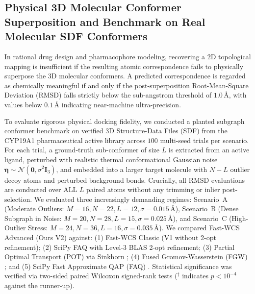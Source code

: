 \documentclass[conference]{IEEEtran}
\begin{document}
\subsection{Physical 3D Molecular Conformer Superposition and Benchmark on Real Molecular SDF Conformers}
\label{subsec:3d_conformer_benchmark}

In rational drug design and pharmacophore modeling, recovering a 2D topological mapping is insufficient if the resulting atomic correspondence fails to physically superpose the 3D molecular conformers. A predicted correspondence is regarded as chemically meaningful if and only if the post-superposition Root-Mean-Square Deviation (RMSD) falls strictly below the sub-angstrom threshold of $1.0\,\text{\AA}$, with values below $0.1\,\text{\AA}$ indicating near-machine ultra-precision.

To evaluate rigorous physical docking fidelity, we conducted a planted subgraph conformer benchmark on verified 3D Structure-Data Files (SDF) from the CYP19A1 pharmaceutical active library across $100$ multi-seed trials per scenario. For each trial, a ground-truth sub-conformer of size $L$ is extracted from an active ligand, perturbed with realistic thermal conformational Gaussian noise $\boldsymbol{\eta} \sim \mathcal{N}(\mathbf{0}, \sigma^2 \mathbf{I}_3)$, and embedded into a larger target molecule with $N - L$ outlier decoy atoms and perturbed background bonds. Crucially, all RMSD evaluations are conducted over ALL $L$ paired atoms without any trimming or inlier post-selection. We evaluated three increasingly demanding regimes: Scenario~A (Moderate Outliers: $M=16, N=22, L=12, \sigma=0.015\,\text{\AA}$), Scenario~B (Dense Subgraph in Noise: $M=20, N=28, L=15, \sigma=0.025\,\text{\AA}$), and Scenario~C (High-Outlier Stress: $M=24, N=36, L=16, \sigma=0.035\,\text{\AA}$). We compared Fast-WCS Advanced (Ours V2) against: (1) Fast-WCS Classic (V1 without 2-opt refinement); (2) SciPy FAQ with Level-3 BLAS 2-opt refinement; (3) Partial Optimal Transport (POT) via Sinkhorn \cite{peyre2019computational}; (4) Fused Gromov-Wasserstein (FGW) \cite{titouan2019optimal}; and (5) SciPy Fast Approximate QAP (FAQ) \cite{vogelstein2015fast}. Statistical significance was verified via two-sided paired Wilcoxon signed-rank tests ($^\dagger$ indicates $p < 10^{-4}$ against the runner-up).
\end{document}
